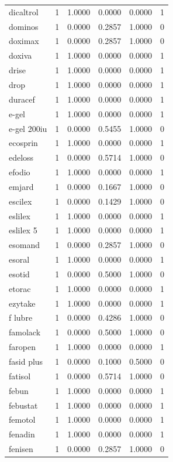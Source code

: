 \begin{longtable}{p{3.0cm}rrrrr}
dicaltrol & 1 & 1.0000 & 0.0000 & 0.0000 & 1 \\
dominos & 1 & 0.0000 & 0.2857 & 1.0000 & 0 \\
doximax & 1 & 0.0000 & 0.2857 & 1.0000 & 0 \\
doxiva & 1 & 1.0000 & 0.0000 & 0.0000 & 1 \\
drise & 1 & 1.0000 & 0.0000 & 0.0000 & 1 \\
drop & 1 & 1.0000 & 0.0000 & 0.0000 & 1 \\
duracef & 1 & 1.0000 & 0.0000 & 0.0000 & 1 \\
e-gel & 1 & 1.0000 & 0.0000 & 0.0000 & 1 \\
e-gel 200iu & 1 & 0.0000 & 0.5455 & 1.0000 & 0 \\
ecosprin & 1 & 1.0000 & 0.0000 & 0.0000 & 1 \\
edeloss & 1 & 0.0000 & 0.5714 & 1.0000 & 0 \\
efodio & 1 & 1.0000 & 0.0000 & 0.0000 & 1 \\
emjard & 1 & 0.0000 & 0.1667 & 1.0000 & 0 \\
escilex & 1 & 0.0000 & 0.1429 & 1.0000 & 0 \\
eslilex & 1 & 1.0000 & 0.0000 & 0.0000 & 1 \\
eslilex 5 & 1 & 1.0000 & 0.0000 & 0.0000 & 1 \\
esomand & 1 & 0.0000 & 0.2857 & 1.0000 & 0 \\
esoral & 1 & 1.0000 & 0.0000 & 0.0000 & 1 \\
esotid & 1 & 0.0000 & 0.5000 & 1.0000 & 0 \\
etorac & 1 & 1.0000 & 0.0000 & 0.0000 & 1 \\
ezytake & 1 & 1.0000 & 0.0000 & 0.0000 & 1 \\
f lubre & 1 & 0.0000 & 0.4286 & 1.0000 & 0 \\
famolack & 1 & 0.0000 & 0.5000 & 1.0000 & 0 \\
faropen & 1 & 1.0000 & 0.0000 & 0.0000 & 1 \\
fasid plus & 1 & 0.0000 & 0.1000 & 0.5000 & 0 \\
fatisol & 1 & 0.0000 & 0.5714 & 1.0000 & 0 \\
febun & 1 & 1.0000 & 0.0000 & 0.0000 & 1 \\
febustat & 1 & 1.0000 & 0.0000 & 0.0000 & 1 \\
femotol & 1 & 1.0000 & 0.0000 & 0.0000 & 1 \\
fenadin & 1 & 1.0000 & 0.0000 & 0.0000 & 1 \\
fenisen & 1 & 0.0000 & 0.2857 & 1.0000 & 0 \\

\end{longtable}
